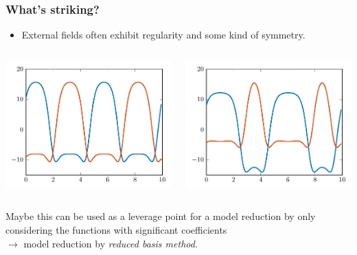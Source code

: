 \begin{frame}[t]
    \frametitle{What's striking?}

    \begin{itemize}
        \item External fields often exhibit regularity and some kind of symmetry.
    \end{itemize}

    \vfill

    \begin{columns}
        \begin{column}{0.5\textwidth}
            \includegraphics[width=\textwidth]{figures/scft1.pdf}
        \end{column}
        \begin{column}{0.5\textwidth}
            \includegraphics[width=\textwidth]{figures/scft_example2_fields.pdf}
        \end{column}
    \end{columns}

    Maybe this can be used as a leverage point for a model reduction by only considering the functions with significant coefficients\\
    $\rightarrow$ model reduction by \emph{reduced basis method}.
\end{frame}


